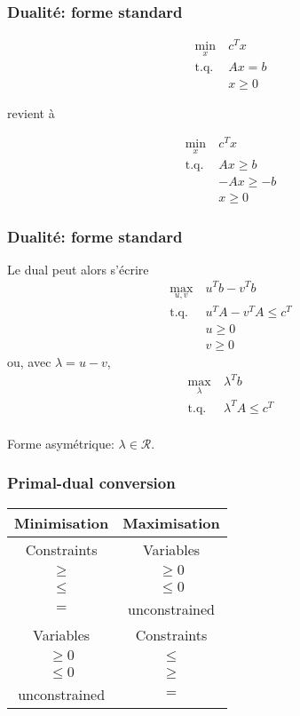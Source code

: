 \documentclass{beamer}
\def\cR{\mathcal{R}}
\begin{document}
\begin{frame}
	\frametitle{Dualité: forme standard}
	
	\begin{align*}
		\min_x \ & c^T x \\
		\mbox{t.q. } & Ax = b \\
		& x \geq 0
	\end{align*}
	
	revient à
	
	\begin{align*}
		\min_x \ & c^T x \\
		\mbox{t.q. } & Ax \geq b \\
		& -Ax \geq -b \\
		& x \geq 0
	\end{align*}
	
\end{frame}

\begin{frame}
	\frametitle{Dualité: forme standard}
	
	Le dual peut alors s'écrire
	\begin{align*}
		\max_{u, v} \ & u^T b - v^T b \\
		\mbox{t.q. } & u^T A - v^T A \leq c^T \\
		& u \geq 0 \\
		& v \geq 0
	\end{align*}
	ou, avec $\lambda = u - v$,
	\begin{align*}
		\max_{\lambda} \ & \lambda^T b \\
		\mbox{t.q. } & \lambda^T A \leq c^T \\
	\end{align*}
	
	Forme asymétrique: $\lambda \in \cR$.
	
\end{frame}


\begin{frame}
	\frametitle{Primal-dual conversion}
	
	\begin{center}
		\begin{tabular}{|c|c|}
			\hline
			\hline
			{\bf Minimisation} & {\bf Maximisation} \\
			\hline
			\hline
			Constraints & Variables \\
			$\geq$ & $\geq 0$ \\
			$\leq$ & $\leq 0$ \\
			$=$ & unconstrained \\
			\hline
			Variables & Constraints \\
			\hline
			$\geq 0$ & $\leq$ \\
			$\leq 0$ & $\geq$ \\
			unconstrained & $=$ \\
			\hline
		\end{tabular}
	\end{center}
	
\end{frame}
\end{document}
